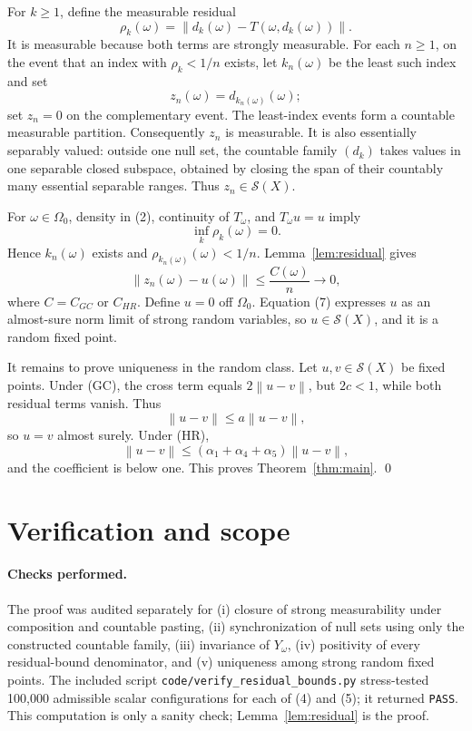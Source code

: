 \documentclass[11pt]{article}
\newcommand{\cS}{\mathcal S}
\newcommand{\norm}[1]{\left\lVert #1\right\rVert}
\begin{document}
For $k\ge1$, define the measurable residual
\[
 \rho_k(\omega)=
 \norm{d_k(\omega)-T(\omega,d_k(\omega))}.
\]
It is measurable because both terms are strongly measurable.  For each
$n\ge1$, on the event that an index with $\rho_k<1/n$ exists, let
$k_n(\omega)$ be the least such index and set
\[
 z_n(\omega)=d_{k_n(\omega)}(\omega);
\]
set $z_n=0$ on the complementary event.  The least-index events form a
countable measurable partition.  Consequently $z_n$ is measurable.  It is
also essentially separably valued: outside one null set, the countable family
$(d_k)$ takes values in one separable closed subspace, obtained by closing the
span of their countably many essential separable ranges.  Thus
$z_n\in\cS(X)$.

For $\omega\in\Omega_0$, density in (2), continuity of $T_\omega$, and
$T_\omega u=u$ imply
\[
 \inf_k\rho_k(\omega)=0.
\]
Hence $k_n(\omega)$ exists and
$\rho_{k_n(\omega)}(\omega)<1/n$.  Lemma~\ref{lem:residual} gives
\[
 \norm{z_n(\omega)-u(\omega)}
 \le \frac{C(\omega)}{n}\longrightarrow0,
 \tag{7}
\]
where $C=C_{GC}$ or $C_{HR}$.  Define $u=0$ off $\Omega_0$.
Equation (7) expresses $u$ as an almost-sure norm limit of strong random
variables, so $u\in\cS(X)$, and it is a random fixed point.

It remains to prove uniqueness in the random class.  Let $u,v\in\cS(X)$ be
fixed points.  Under (GC), the cross term equals
$2\norm{u-v}$, but $2c<1$, while both residual terms vanish.  Thus
\[
 \norm{u-v}\le a\norm{u-v},
\]
so $u=v$ almost surely.  Under (HR),
\[
 \norm{u-v}
 \le(\alpha_1+\alpha_4+\alpha_5)\norm{u-v},
\]
and the coefficient is below one.  This proves Theorem~\ref{thm:main}.
\qed

\section{Verification and scope}

\paragraph{Checks performed.}
The proof was audited separately for (i) closure of strong measurability under
composition and countable pasting, (ii) synchronization of null sets using
only the constructed countable family, (iii) invariance of $Y_\omega$, (iv)
positivity of every residual-bound denominator, and (v) uniqueness among
strong random fixed points.  The included script
\texttt{code/verify\_residual\_bounds.py} stress-tested 100,000 admissible
scalar configurations for each of (4) and (5); it returned \texttt{PASS}.
This computation is only a sanity check; Lemma~\ref{lem:residual} is the proof.
\end{document}
